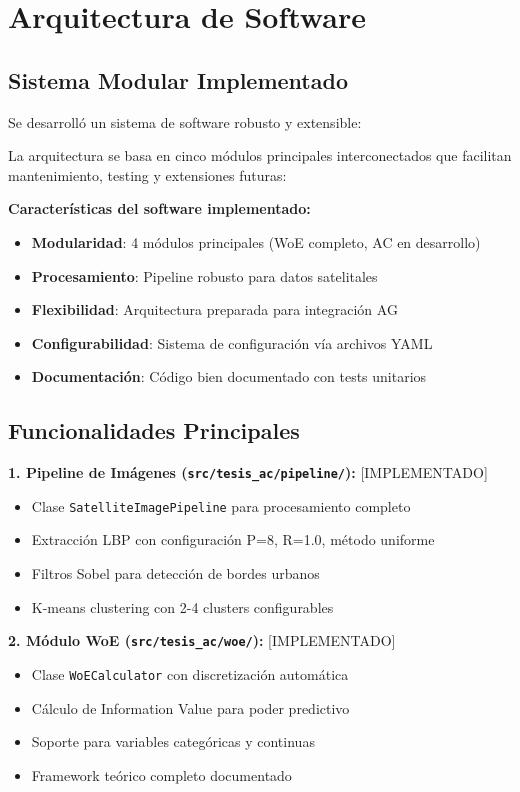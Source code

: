 \documentclass[12pt,letterpaper]{article}
\begin{document}
\section{Arquitectura de Software}

\subsection{Sistema Modular Implementado}

Se desarrolló un sistema de software robusto y extensible:

La arquitectura se basa en cinco módulos principales interconectados que facilitan mantenimiento, testing y extensiones futuras:

\textbf{Características del software implementado:}
\begin{itemize}
\item \textbf{Modularidad}: 4 módulos principales (WoE completo, AC en desarrollo)
\item \textbf{Procesamiento}: Pipeline robusto para datos satelitales
\item \textbf{Flexibilidad}: Arquitectura preparada para integración AG
\item \textbf{Configurabilidad}: Sistema de configuración vía archivos YAML
\item \textbf{Documentación}: Código bien documentado con tests unitarios
\end{itemize}

\subsection{Funcionalidades Principales}

\textbf{1. Pipeline de Imágenes (\texttt{src/tesis\_ac/pipeline/}):} [IMPLEMENTADO]
\begin{itemize}
\item Clase \texttt{SatelliteImagePipeline} para procesamiento completo
\item Extracción LBP con configuración P=8, R=1.0, método uniforme
\item Filtros Sobel para detección de bordes urbanos
\item K-means clustering con 2-4 clusters configurables
\end{itemize}

\textbf{2. Módulo WoE (\texttt{src/tesis\_ac/woe/}):} [IMPLEMENTADO]
\begin{itemize}
\item Clase \texttt{WoECalculator} con discretización automática
\item Cálculo de Information Value para poder predictivo
\item Soporte para variables categóricas y continuas
\item Framework teórico completo documentado
\end{itemize}
\end{document}
